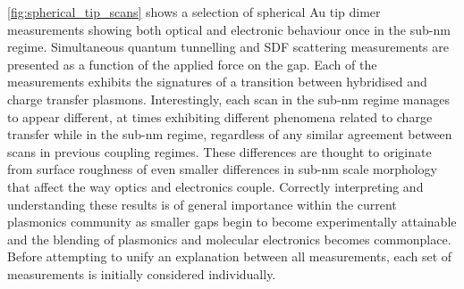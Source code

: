 \documentclass[a4paper]{article}
\begin{document}
\autoref{fig:spherical_tip_scans} shows a selection of spherical Au tip dimer measurements showing both optical and electronic behaviour once in the sub-nm regime. Simultaneous quantum tunnelling and SDF scattering measurements are presented as a function of the applied force on the gap. Each of the measurements exhibits the signatures of a transition between hybridised and charge transfer plasmons. Interestingly, each scan in the sub-nm regime manages to appear different, at times exhibiting different phenomena related to charge transfer while in the sub-nm regime, regardless of any similar agreement between scans in previous coupling regimes. These differences are thought to originate from surface roughness of even smaller differences in sub-nm scale morphology that affect the way optics and electronics couple. Correctly interpreting and understanding these results is of general importance within the current plasmonics community as smaller gaps begin to become experimentally attainable and the blending of plasmonics and molecular electronics becomes commonplace. Before attempting to unify an explanation between all measurements, each set of measurements is initially considered individually.
\end{document}
